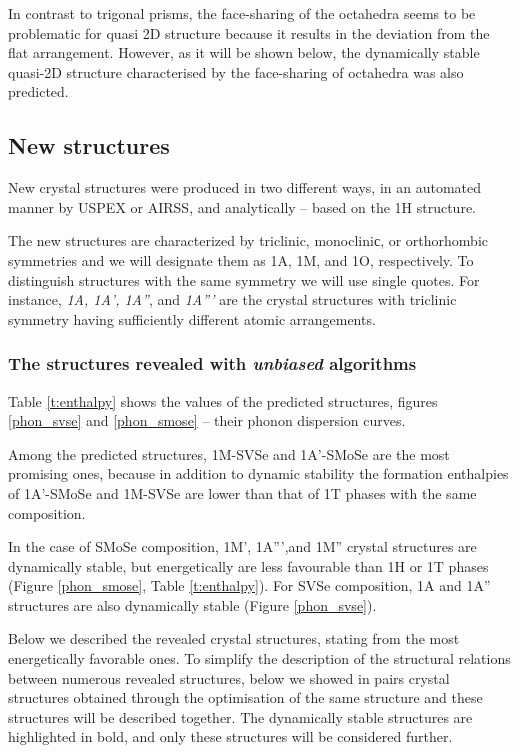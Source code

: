 \documentclass[a4paperm]{article}
\begin{document}
In contrast to trigonal prisms, the face-sharing of the octahedra seems to be problematic for quasi 2D structure because it results in the deviation from the flat arrangement.
However, as it will be shown below, the dynamically stable quasi-2D structure characterised by the face-sharing of octahedra was also predicted.




		\subsection{New structures}

New crystal structures were produced in two different ways, in an automated manner by USPEX or AIRSS, and analytically -- based on the 1H structure.


The new structures are characterized by triclinic, monocliniс, or orthorhombic symmetries and we will designate them as 1A, 1M, and 1O, respectively.
To distinguish structures with the same symmetry we will use single quotes.
For instance, {\it 1A, 1A', 1A''}, and {\it 1A'''} are the crystal structures with triclinic symmetry having sufficiently different atomic arrangements.



\subsubsection{The structures revealed with {\it unbiased} algorithms}
Table \ref{t:enthalpy} shows the values of the predicted structures, figures \ref{phon_svse} and  \ref{phon_smose} -- their phonon dispersion curves. 

Among the predicted structures, 1M-SVSe and 1A'-SMoSe are the most promising ones, because in addition to dynamic stability the formation enthalpies of 1A'-SMoSe and 1M-SVSe are lower than that of 1T phases with the same composition. 


In the case of SMoSe composition, 1M', 1A''',and 1M'' crystal structures are dynamically stable, but energetically are less favourable than 1H or 1T phases (Figure \ref{phon_smose}, Table \ref{t:enthalpy}).
For SVSe composition, 1A and 1A'' structures are also dynamically stable (Figure \ref{phon_svse}). 

Below we described the revealed crystal structures, stating from the most energetically favorable ones.
To simplify the description of the structural relations between numerous revealed structures, below we showed in pairs crystal structures obtained through the optimisation of the same structure and these structures will be described together.
The dynamically stable structures are highlighted in bold, and only these structures will be considered further.
\end{document}
